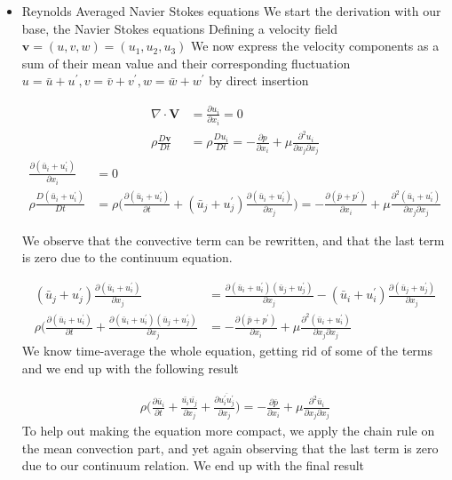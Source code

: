 \documentclass[a4paper,norsk]{article}
\begin{document}
\begin{itemize}
\item{} Reynolds Averaged Navier Stokes equations \newline
We start the derivation with our base, the Navier Stokes equations \newline
Defining a velocity field  $\mathbf{v} = (u,v,w) = (u_1, u_2, u_3)$ \newline
We now express the velocity components as a sum of their mean value and their corresponding fluctuation
$u =\bar{u} + u^\prime, v =\bar{v} + v^\prime, w =\bar{w} + w^\prime$ by direct insertion 

\begin{align*}
\nabla \cdot \mathbf{V} &= \frac{\partial u_i}{\partial x_i} = 0 \\
\rho \frac{D\mathbf{v}}{Dt} &= \rho \frac{Du_i}{Dt} =
- \frac{\partial p}{\partial x_i} + \mu \frac{\partial^2 u_i}{\partial x_j \partial x_j} 
\end{align*}
\begin{align*}
\frac{\partial(\bar{u}_i + u^\prime_i)}{\partial x_i} &= 0 \\
\rho \frac{D(\bar{u}_i + u^\prime_i)}{Dt} &= \rho\big(\frac{\partial(\bar{u}_i + u^\prime_i)}{\partial t}   
+ (\bar{u}_j + u^\prime_j) \frac{\partial (\bar{u}_i + u^\prime_i)}{\partial x_j} \big) =
- \frac{\partial (\bar{p} + p^\prime)}{\partial x_i} + \mu \frac{\partial^2(\bar{u}_i + u^\prime_i)}
{\partial x_j \partial x_j}
\end{align*}

We observe that the convective term can be rewritten, and that the last term is zero due to the
continuum equation.
 
\begin{align*}
(\bar{u}_j + u^\prime_j) \frac{\partial (\bar{u}_i + u^\prime_i)}{\partial x_j} &= 
\frac{\partial (\bar{u}_i + u^\prime_i)(\bar{u}_j + u^\prime_j)}{\partial x_j} -
(\bar{u}_i + u^\prime_i)\frac{\partial (\bar{u}_j + u^\prime_j)}{\partial x_j} \\
\rho\big(\frac{\partial(\bar{u}_i + u^\prime_i)}{\partial t}   
+   \frac{\partial (\bar{u}_i + u^\prime_i)(\bar{u}_j + u^\prime_j)}{\partial x_j} &=
- \frac{\partial (\bar{p} + p^\prime)}{\partial x_i} + \mu \frac{\partial^2(\bar{u}_i + u^\prime_i)}
{\partial x_j \partial x_j}
\end{align*}
We know time-average the whole equation, getting rid of some of the terms and we end up with the following result

\begin{align*}
\rho \big( \frac{\partial \bar{u}_i}{\partial t} + \frac{\bar{u_i}\bar{u_j}}{\partial x_j} 
+ \frac{\partial \overline{u^\prime_i u^\prime_j}}{\partial x_j}  \big) = 
- \frac{\partial \bar{p}}{\partial x_i} + \mu \frac{\partial^2 \bar{u}_i}{\partial x_j \partial x_j}
\end{align*}
To help out making the equation more compact, we apply the chain rule on the mean convection part, and yet again
observing that the last term is zero due to our continuum relation. We end up with the final result


\end{itemize}
\end{document}
